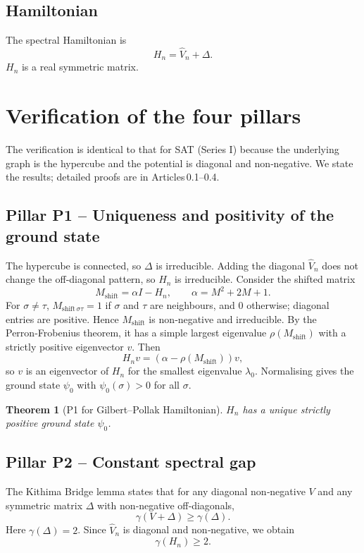 \documentclass[11pt,a4paper]{article}
\newtheorem{theorem}{Theorem}[section]
\begin{document}
\subsection{Hamiltonian}
The spectral Hamiltonian is
\[
H_n = \hat{V}_n + \Delta.
\]
\(H_n\) is a real symmetric matrix.

\section{Verification of the four pillars}
The verification is identical to that for SAT (Series I) because the underlying graph is the hypercube and the potential is diagonal and non‑negative. We state the results; detailed proofs are in Articles 0.1–0.4.

\subsection{Pillar P1 – Uniqueness and positivity of the ground state}
The hypercube is connected, so \(\Delta\) is irreducible. Adding the diagonal \(\hat{V}_n\) does not change the off‑diagonal pattern, so \(H_n\) is irreducible. Consider the shifted matrix
\[
M_{\text{shift}} = \alpha I - H_n,\qquad \alpha = M^2 + 2M + 1.
\]
For \(\sigma\neq\tau\), \(M_{\text{shift}\,\sigma\tau} = 1\) if \(\sigma\) and \(\tau\) are neighbours, and \(0\) otherwise; diagonal entries are positive. Hence \(M_{\text{shift}}\) is non‑negative and irreducible. By the Perron‑Frobenius theorem, it has a simple largest eigenvalue \(\rho(M_{\text{shift}})\) with a strictly positive eigenvector \(v\). Then
\[
H_n v = (\alpha - \rho(M_{\text{shift}})) v,
\]
so \(v\) is an eigenvector of \(H_n\) for the smallest eigenvalue \(\lambda_0\). Normalising gives the ground state \(\psi_0\) with \(\psi_0(\sigma) > 0\) for all \(\sigma\).

\begin{theorem}[P1 for Gilbert–Pollak Hamiltonian]
\(H_n\) has a unique strictly positive ground state \(\psi_0\).
\end{theorem}

\subsection{Pillar P2 – Constant spectral gap}
The Kithima Bridge lemma states that for any diagonal non‑negative \(V\) and any symmetric matrix \(\Delta\) with non‑negative off‑diagonals,
\[
\gamma(V + \Delta) \ge \gamma(\Delta).
\]
Here \(\gamma(\Delta) = 2\). Since \(\hat{V}_n\) is diagonal and non‑negative, we obtain
\[
\gamma(H_n) \ge 2.
\]
\end{document}
